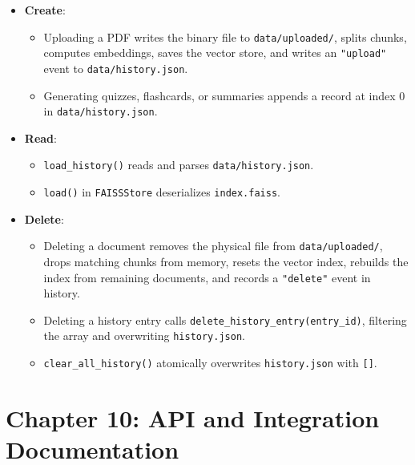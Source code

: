\documentclass[
]{article}
\providecommand{\tightlist}{%
  \setlength{\itemsep}{0pt}\setlength{\parskip}{0pt}}
\begin{document}
\begin{itemize}
\tightlist
\item
  \textbf{Create}:

  \begin{itemize}
  \tightlist
  \item
    Uploading a PDF writes the binary file to \texttt{data/\allowbreak uploaded/\allowbreak },
    splits chunks, computes embeddings, saves the vector store, and
    writes an \texttt{"upload"} event to \texttt{data/\allowbreak history.\allowbreak json}.
  \item
    Generating quizzes, flashcards, or summaries appends a record at
    index 0 in \texttt{data/\allowbreak history.\allowbreak json}.
  \end{itemize}
\item
  \textbf{Read}:

  \begin{itemize}
  \tightlist
  \item
    \texttt{load\_\allowbreak history(\allowbreak )\allowbreak } reads and parses
    \texttt{data/\allowbreak history.\allowbreak json}.
  \item
    \texttt{load(\allowbreak )\allowbreak } in \texttt{FAISSStore} deserializes
    \texttt{index.\allowbreak faiss}.
  \end{itemize}
\item
  \textbf{Delete}:

  \begin{itemize}
  \tightlist
  \item
    Deleting a document removes the physical file from
    \texttt{data/\allowbreak uploaded/\allowbreak }, drops matching chunks from memory, resets
    the vector index, rebuilds the index from remaining documents, and
    records a \texttt{"delete"} event in history.
  \item
    Deleting a history entry calls
    \texttt{delete\_\allowbreak history\_\allowbreak entry(\allowbreak entry\_\allowbreak id)\allowbreak }, filtering the array and
    overwriting \texttt{history.\allowbreak json}.
  \item
    \texttt{clear\_\allowbreak all\_\allowbreak history(\allowbreak )\allowbreak } atomically overwrites
    \texttt{history.\allowbreak json} with \texttt{{[}{]}}.
  \end{itemize}
\end{itemize}

\section{Chapter 10: API and Integration
Documentation}\label{chapter-10-api-and-integration-documentation}
\end{document}

